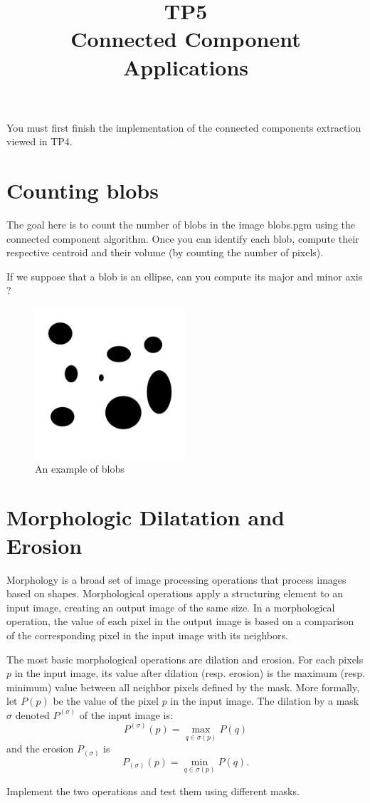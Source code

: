 \documentclass[a4paper, 11pt]{article}
\title{\bf{TP5 \\ Connected Component Applications}}
\author{}
\date{}
\begin{document}
\maketitle

You must first finish the implementation of the connected components extraction viewed in TP4.

\section*{\bf Counting blobs}

The goal here is to count the number of blobs in the image blobs.pgm using the connected component algorithm.
Once you can identify each blob, compute their respective centroid and their volume (by counting the number of pixels).

If we suppose that a blob is an ellipse, can you compute its major and minor axis ?

\begin{figure}
  \centering
  \includegraphics[width=0.5\textwidth]{blobs}
  \caption{An example of blobs}
\end{figure}

\section*{\bf Morphologic Dilatation and Erosion}

Morphology is a broad set of image processing operations that process images based on shapes. 
Morphological operations apply a structuring element to an input image, creating an output image of the same size. 
In a morphological operation, the value of each pixel in the output image is based on a comparison of the corresponding pixel in the input image with its neighbors. 

The most basic morphological operations are dilation and erosion. 
For each pixels $p$ in the input image, its value after dilation (resp. erosion) is the maximum (resp. minimum) value between all neighbor pixels defined by the mask.
More formally, let $P(p)$ be the value of the pixel $p$ in the input image. The dilation by a mask $\sigma$ denoted $P^{(\sigma)}$ of the input image is:
\[
  P^{(\sigma)}(p) = \max_{q\in\sigma(p)} P(q)
\]
and the erosion $P_{(\sigma)}$ is
\[
  P_{(\sigma)}(p) = \min_{q\in\sigma(p)} P(q).
\]

Implement the two operations and test them using different masks.
\end{document}

